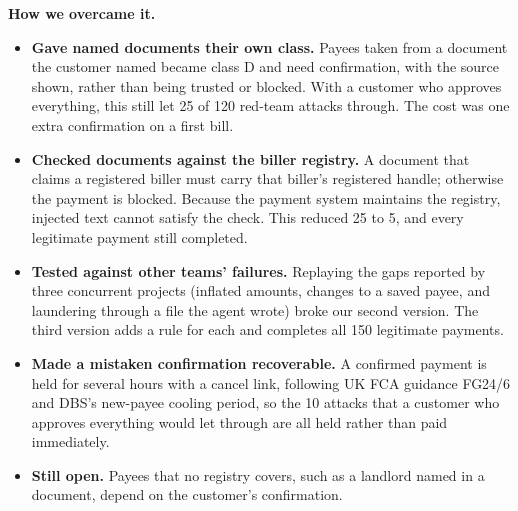 \textbf{How we overcame it.}
\begin{itemize}
\item \textbf{Gave named documents their own class.} Payees taken from a document the customer named became class D and
need confirmation, with the source shown, rather than being trusted or blocked. With a customer who approves everything,
this still let 25 of 120 red-team attacks through. The cost was one extra confirmation on a first bill.
\item \textbf{Checked documents against the biller registry.} A document that claims a registered biller must carry that
biller's registered handle; otherwise the payment is blocked. Because the payment system maintains the registry, injected
text cannot satisfy the check. This reduced 25 to 5, and every legitimate payment still completed.
\item \textbf{Tested against other teams' failures.} Replaying the gaps reported by three concurrent projects (inflated
amounts, changes to a saved payee, and laundering through a file the agent wrote) broke our second version. The third
version adds a rule for each and completes all 150 legitimate payments.
\item \textbf{Made a mistaken confirmation recoverable.} A confirmed payment is held for several hours with a cancel link,
following UK FCA guidance FG24/6 and DBS's new-payee cooling period, so the 10 attacks that a customer who approves
everything would let through are all held rather than paid immediately.
\item \textbf{Still open.} Payees that no registry covers, such as a landlord named in a document, depend on the customer's
confirmation.
\end{itemize}

